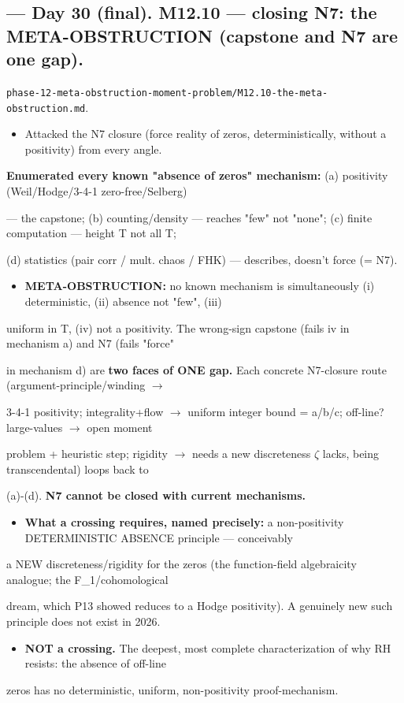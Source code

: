 \documentclass[10pt]{article}
\begin{document}
\subsection*{ --- Day 30 (final). M12.10 --- closing N7: the META-OBSTRUCTION (capstone and N7 are one gap).}
\texttt{phase-12-meta-obstruction-moment-problem/M12.10-the-meta-obstruction.md}.\par
\begin{itemize}
\item Attacked the N7 closure (force reality of zeros, deterministically, without a positivity) from every angle.
\end{itemize}
  \textbf{Enumerated every known "absence of zeros" mechanism:} (a) positivity (Weil/Hodge/3-4-1 zero-free/Selberg)\par
  --- the capstone; (b) counting/density --- reaches "few" not "none"; (c) finite computation --- height T not all T;\par
  (d) statistics (pair corr / mult. chaos / FHK) --- describes, doesn't force (= N7).\par
\begin{itemize}
\item \textbf{META-OBSTRUCTION:} no known mechanism is simultaneously (i) deterministic, (ii) absence not "few", (iii)
\end{itemize}
  uniform in T, (iv) not a positivity. The wrong-sign capstone (fails iv in mechanism a) and N7 (fails "force"\par
  in mechanism d) are \textbf{two faces of ONE gap.} Each concrete N7-closure route (argument-principle/winding \ensuremath{\to}\par
  3-4-1 positivity; integrality+flow \ensuremath{\to} uniform integer bound = a/b/c; off-line?large-values \ensuremath{\to} open moment\par
  problem + heuristic step; rigidity \ensuremath{\to} needs a new discreteness \ensuremath{\zeta} lacks, being transcendental) loops back to\par
  (a)-(d). \textbf{N7 cannot be closed with current mechanisms.}\par
\begin{itemize}
\item \textbf{What a crossing requires, named precisely:} a non-positivity DETERMINISTIC ABSENCE principle --- conceivably
\end{itemize}
  a NEW discreteness/rigidity for the zeros (the function-field algebraicity analogue; the F\_1/cohomological\par
  dream, which P13 showed reduces to a Hodge positivity). A genuinely new such principle does not exist in 2026.\par
\begin{itemize}
\item \textbf{NOT a crossing.} The deepest, most complete characterization of why RH resists: the absence of off-line
\end{itemize}
  zeros has no deterministic, uniform, non-positivity proof-mechanism.\par
\end{document}
